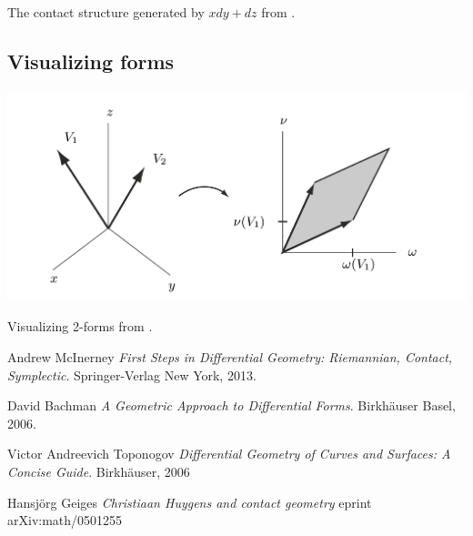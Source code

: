 \documentclass{article}
\theoremstyle{definition}
\begin{document}
The contact structure generated by $xdy + dz$ from \cite{bachman}.

\subsection {Visualizing forms}

\includegraphics[scale=0.5]{form_vis_bachman}

Visualizing 2-forms from \cite{bachman}.


\begin{thebibliography}{9}

{}
  
  Andrew McInerney
  \textit{First Steps in Differential Geometry: Riemannian, Contact, Symplectic}. 
  Springer-Verlag New York, 2013.

  David Bachman
  \textit{A Geometric Approach to Differential Forms}.
  Birkhäuser Basel, 2006.

  Victor Andreevich Toponogov
  \textit{Differential Geometry of Curves and Surfaces: A Concise Guide}. 
  Birkhäuser, 2006

  Hansjörg Geiges
  \textit{Christiaan Huygens and contact geometry}
  eprint arXiv:math/0501255

\end{thebibliography}
\end{document}
